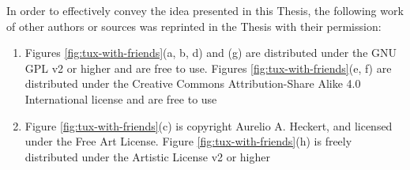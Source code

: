 In order to effectively convey the idea presented in this Thesis, the
following work of other authors or sources was reprinted in the Thesis with
their permission:
\begin{enumerate}
\item Figures \ref{fig:tux-with-friends}(a, b, d) and (g) are distributed under the
GNU GPL v2 or higher and are free to use. Figures \ref{fig:tux-with-friends}(e, f)
are distributed under the Creative Commons Attribution-Share Alike 4.0 International
license and are free to use

\item Figure \ref{fig:tux-with-friends}(c) is copyright Aurelio A. Heckert, and licensed
under the Free Art License. Figure \ref{fig:tux-with-friends}(h) is freely distributed under the Artistic
License v2 or higher
\end{enumerate}
\par
